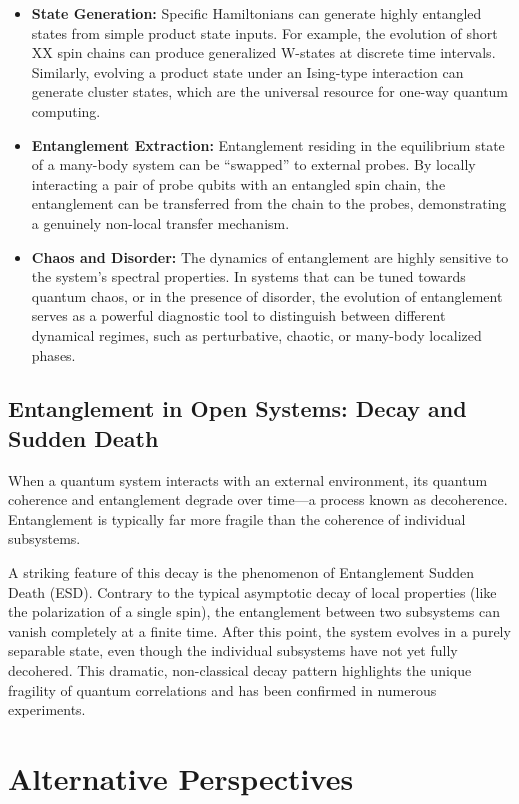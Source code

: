 \begin{itemize}
	\item \textbf{State Generation:} Specific Hamiltonians can generate
		highly entangled states from simple product state inputs. For example,
		the evolution of short XX spin chains can produce generalized
		W-states at discrete time intervals. Similarly, evolving a
		product state under an Ising-type interaction can generate
		cluster states, which are the universal resource for
		one-way quantum computing.
	\item \textbf{Entanglement Extraction:} Entanglement residing in the
		equilibrium state of a many-body system can be ``swapped'' to external
		probes. By locally interacting a pair of probe qubits with an
		entangled spin chain, the entanglement can be transferred from the
		chain to the probes, demonstrating a genuinely non-local transfer
		mechanism.
	\item \textbf{Chaos and Disorder:} The dynamics of entanglement are highly
		sensitive to the system's spectral properties. In systems that can be
		tuned towards quantum chaos, or in the presence of disorder, the
		evolution of entanglement serves as a powerful diagnostic tool to
		distinguish between different dynamical regimes, such as perturbative,
		chaotic, or many-body localized phases.
\end{itemize}

\subsection{Entanglement in Open Systems: Decay and Sudden Death}
\label{sub:decay}

When a quantum system interacts with an external environment, its quantum
coherence and entanglement degrade over time---a process known as
decoherence. Entanglement is typically far more fragile than the coherence of
individual subsystems.

A striking feature of this decay is the phenomenon of
Entanglement Sudden Death (ESD). Contrary to the typical asymptotic
decay of local properties (like the polarization of a single spin), the
entanglement between two subsystems can vanish completely at a finite time.
After this point, the system evolves in a purely separable state, even
though the individual subsystems have not yet fully decohered. This dramatic,
non-classical decay pattern highlights the unique fragility of quantum
correlations and has been confirmed in numerous experiments.

\section{Alternative Perspectives}
\label{sec:alternative_perspectives}

